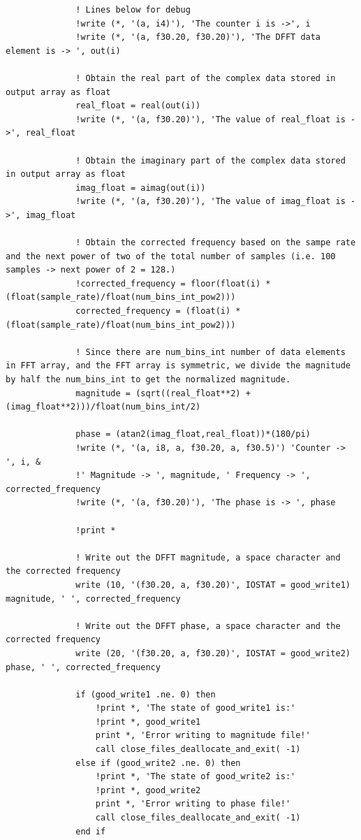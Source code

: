 \begin{verbatim}
              ! Lines below for debug
              !write (*, '(a, i4)'), 'The counter i is ->', i
              !write (*, '(a, f30.20, f30.20)'), 'The DFFT data element is -> ', out(i)
              
              ! Obtain the real part of the complex data stored in output array as float
              real_float = real(out(i))
              !write (*, '(a, f30.20)'), 'The value of real_float is ->', real_float
                  
              ! Obtain the imaginary part of the complex data stored in output array as float
              imag_float = aimag(out(i))
              !write (*, '(a, f30.20)'), 'The value of imag_float is ->', imag_float
              
              ! Obtain the corrected frequency based on the sampe rate and the next power of two of the total number of samples (i.e. 100 samples -> next power of 2 = 128.)
              !corrected_frequency = floor(float(i) * (float(sample_rate)/float(num_bins_int_pow2)))
              corrected_frequency = (float(i) * (float(sample_rate)/float(num_bins_int_pow2)))
              
              ! Since there are num_bins_int number of data elements in FFT array, and the FFT array is symmetric, we divide the magnitude by half the num_bins_int to get the normalized magnitude.
              magnitude = (sqrt((real_float**2) + (imag_float**2)))/float(num_bins_int/2)
              
              phase = (atan2(imag_float,real_float))*(180/pi)
              !write (*, '(a, i8, a, f30.20, a, f30.5)') 'Counter -> ', i, &
              !' Magnitude -> ', magnitude, ' Frequency -> ', corrected_frequency
              !write (*, '(a, f30.20)'), 'The phase is -> ', phase
              
              !print *
              
              ! Write out the DFFT magnitude, a space character and the corrected frequency
              write (10, '(f30.20, a, f30.20)', IOSTAT = good_write1) magnitude, ' ', corrected_frequency
              
              ! Write out the DFFT phase, a space character and the corrected frequency
              write (20, '(f30.20, a, f30.20)', IOSTAT = good_write2) phase, ' ', corrected_frequency
              
              if (good_write1 .ne. 0) then
                  !print *, 'The state of good_write1 is:'
                  !print *, good_write1
                  print *, 'Error writing to magnitude file!'
                  call close_files_deallocate_and_exit( -1)
              else if (good_write2 .ne. 0) then
                  !print *, 'The state of good_write2 is:'
                  !print *, good_write2
                  print *, 'Error writing to phase file!'
                  call close_files_deallocate_and_exit( -1)
              end if
  

\end{verbatim}
